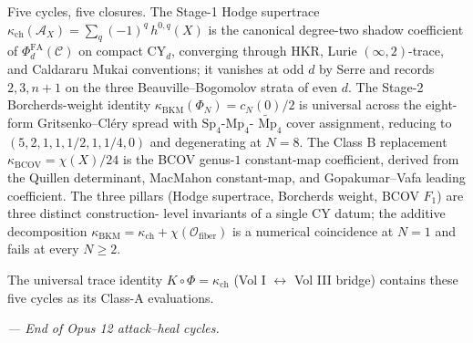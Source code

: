 Five cycles, five closures. The Stage-1 Hodge supertrace
$\kappa_{\mathrm{ch}}(\mathcal{A}_X) = \sum_q (-1)^q\, h^{0, q}
(X)$ is the canonical degree-two shadow coefficient of
$\Phi^{\mathrm{FA}}_d(\mathcal{C})$ on compact CY$_d$, converging
through HKR, Lurie $(\infty, 2)$-trace, and Caldararu Mukai
conventions; it vanishes at odd $d$ by Serre and records
$2, 3, n + 1$ on the three Beauville--Bogomolov strata of even
$d$. The Stage-2 Borcherds-weight identity $\kappa_{\mathrm{BKM}}
(\Phi_N) = c_N(0)/2$ is universal across the eight-form
Gritsenko--Cl\'ery spread with $\mathrm{Sp}_4$-$\mathrm{Mp}_4$-
$\widetilde{\mathrm{Mp}}_4$ cover assignment, reducing to
$(5, 2, 1, 1, 1/2, 1, 1/4, 0)$ and degenerating at $N = 8$. The
Class B replacement $\kappa_{\mathrm{BCOV}} = \chi(X)/24$ is the
BCOV genus-$1$ constant-map coefficient, derived from the
Quillen determinant, MacMahon constant-map, and Gopakumar--Vafa
leading coefficient. The three pillars (Hodge supertrace,
Borcherds weight, BCOV $F_1$) are three distinct construction-
level invariants of a single CY datum; the additive decomposition
$\kappa_{\mathrm{BKM}} = \kappa_{\mathrm{ch}} +
\chi(\mathcal{O}_{\mathrm{fiber}})$ is a numerical coincidence at
$N = 1$ and fails at every $N \geq 2$.

The universal trace identity
$K \circ \Phi = \kappa_{\mathrm{ch}}$ (Vol I $\leftrightarrow$
Vol III bridge) contains these five cycles as its Class-A
evaluations.

\emph{--- End of Opus 12 attack--heal cycles.}
